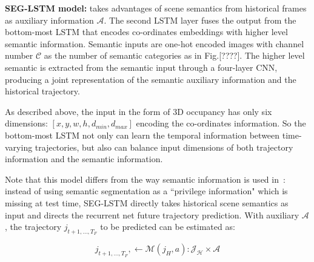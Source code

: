 \documentclass[10pt,twocolumn,letterpaper]{article}
\begin{document}
\vspace{\baselineskip}
\noindent \textbf{SEG-LSTM model:}
 takes advantages of scene semantics from  historical frames as auxiliary information $\mathcal{A}$. The second LSTM layer fuses the output from the bottom-most LSTM that encodes co-ordinates embeddings with higher level semantic information. Semantic inputs are one-hot encoded images with channel number $\mathcal{C}$ as the number of semantic categories  as in Fig.[????]. The higher level semantic is extracted from the semantic input through a four-layer CNN, producing a joint representation of the semantic auxiliary information and the historical trajectory.
 
 As described above, the input in the form of 3D occupancy has only six dimensions: $[x, y, w, h, d_{min}, d_{max}]$ encoding the co-ordinates information. So the bottom-most LSTM not only can learn the temporal information between time-varying trajectories,  but also can balance input dimensions of both trajectory information and the semantic information.

Note that this model differs from the way semantic information is used in~\cite{xu2017end}: instead of using semantic segmentation as a ``privilege information" which is missing at test time, SEG-LSTM directly takes historical scene semantics as input and directs the recurrent net future trajectory prediction. With auxiliary $\mathcal{A}$, the trajectory  $j_{t+1, \ldots, T_F}$  to be predicted can be estimated as:

\begin{equation}
j_{t+1, \ldots, T_F}, \leftarrow  \bm{\mathcal{M}}(j_H, a): \mathcal{J_H} \times \mathcal{A}
\label{eq:SEG-LSTM}
\end{equation}
\end{document}
